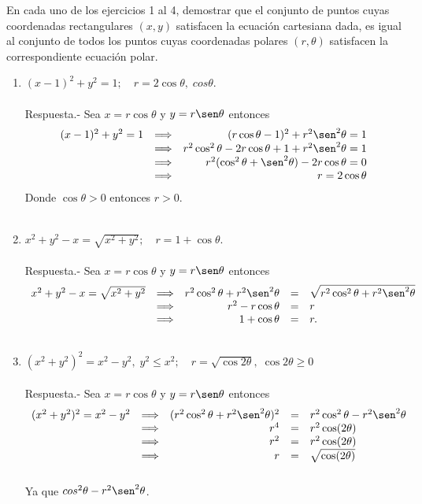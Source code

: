 En cada uno de los ejercicios 1 al 4, demostrar que el conjunto de puntos cuyas coordenadas rectangulares $(x,y)$ satisfacen la ecuación cartesiana dada, es igual al conjunto de todos los puntos cuyas coordenadas polares $(r,\theta)$ satisfacen la correspondiente ecuación polar.
\begin{enumerate}[ \bfseries 1.]

    \item $(x-1)^2 + y^2 = 1;\quad r=2\cos \theta, \; cos \theta$.\\\\
	Respuesta.-\; Sea $x = r\cos \theta$ y $y=r\sen \theta$ entonces
	$$\begin{array}{rcr}
	    (x-1)^2 + y^2 = 1 &\Longrightarrow & (r\cos \theta - 1)^2 + r^2 \sen^2 \theta = 1\\
	    &\Longrightarrow & r^2 \cos^2 \theta - 2r \cos \theta  + 1 + r^2\sen^2 \theta = 1\\
	    &\Longrightarrow & r^2(\cos^2 \theta + \sen^2 \theta) - 2r\cos \theta = 0\\
	    &\Longrightarrow & r = 2\cos \theta\\
	\end{array}$$
	Donde $\cos \theta > 0$ entonces $r>0$.\\\\

    \item $x^2 + y^2 - x = \sqrt{x^2 + y^2};\quad r=1+\cos \theta$.\\\\
	Respuesta.-\; Sea  $x = r\cos \theta$ y $y=r\sen \theta$ entonces
	$$\begin{array}{rcrcl}
	    x^2 + y^2 - x = \sqrt{x^2 + y^2}&\Longrightarrow&r^2\cos^2 \theta + r^2\sen^2 \theta&=&\sqrt{r^2\cos^2\theta + r^2\sen^2\theta}\\
	    &\Longrightarrow&r^2 - r\cos \theta&=&r\\
	    &\Longrightarrow&1+\cos \theta&=&r.\\\\
	\end{array}$$


    \item $(x^2+y^2)^2 = x^2 - y^2,\; y^2 \leq x^2; \quad r=\sqrt{\cos 2\theta},\; \cos 2\theta \geq 0$\\\\
	Respuesta.-\; Sea $x = r\cos \theta$ y $y=r\sen \theta$ entonces
	$$\begin{array}{rcrcl}
	    (x^2+y^2)^2 = x^2 - y^2 &\Longrightarrow& (r^2 \cos^2 \theta + r^2 \sen^2 \theta)^2&=&r^2 \cos^2 \theta - r^2 \sen^2 \theta\\
				    &\Longrightarrow&r^4&=&r^2\cos(2\theta)\\
				    &\Longrightarrow&r^2&=&r^2 \cos(2\theta)\\
				    &\Longrightarrow&r&=&\sqrt{\cos(2\theta)}\\\\
	\end{array}$$
	Ya que $cos^2\theta - r^2 \sen^2 \theta$.\\\\



\end{enumerate}
